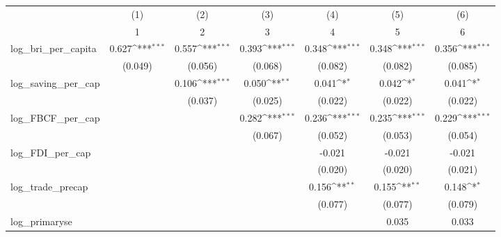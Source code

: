 {
\def\sym#1{\ifmmode^{#1}\else\(^{#1}\)\fi}
\begin{tabular}{l*{6}{c}}
\toprule
            &\multicolumn{1}{c}{(1)}&\multicolumn{1}{c}{(2)}&\multicolumn{1}{c}{(3)}&\multicolumn{1}{c}{(4)}&\multicolumn{1}{c}{(5)}&\multicolumn{1}{c}{(6)}\\
            &\multicolumn{1}{c}{1}&\multicolumn{1}{c}{2}&\multicolumn{1}{c}{3}&\multicolumn{1}{c}{4}&\multicolumn{1}{c}{5}&\multicolumn{1}{c}{6}\\
\midrule
log\_bri\_per\_capita&       0.627\sym{***}&       0.557\sym{***}&       0.393\sym{***}&       0.348\sym{***}&       0.348\sym{***}&       0.356\sym{***}\\
            &     (0.049)         &     (0.056)         &     (0.068)         &     (0.082)         &     (0.082)         &     (0.085)         \\
\addlinespace
log\_saving\_per\_cap&                     &       0.106\sym{***}&       0.050\sym{**} &       0.041\sym{*}  &       0.042\sym{*}  &       0.041\sym{*}  \\
            &                     &     (0.037)         &     (0.025)         &     (0.022)         &     (0.022)         &     (0.022)         \\
\addlinespace
log\_FBCF\_per\_cap&                     &                     &       0.282\sym{***}&       0.236\sym{***}&       0.235\sym{***}&       0.229\sym{***}\\
            &                     &                     &     (0.067)         &     (0.052)         &     (0.053)         &     (0.054)         \\
\addlinespace
log\_FDI\_per\_cap&                     &                     &                     &      -0.021         &      -0.021         &      -0.021         \\
            &                     &                     &                     &     (0.020)         &     (0.020)         &     (0.021)         \\
\addlinespace
log\_trade\_precap&                     &                     &                     &       0.156\sym{**} &       0.155\sym{**} &       0.148\sym{*}  \\
            &                     &                     &                     &     (0.077)         &     (0.077)         &     (0.079)         \\
\addlinespace
log\_primaryse&                     &                     &                     &                     &       0.035         &       0.033         \\

\end{tabular}}
